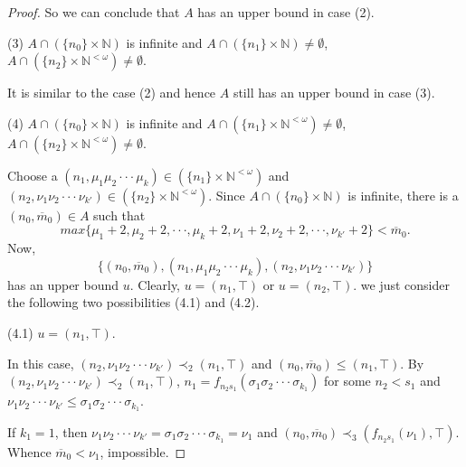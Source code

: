\documentclass[10pt,a4paper]{amsart}
\begin{document}
\begin{proof}
So we can conclude that $A$ has an upper bound in case (2).



(3) $A\cap(\{n_{0}\}\times\mathbb{N})$ is infinite and $A\cap(\{n_{1}\}\times\mathbb{N})\neq\emptyset$, $A\cap(\{n_{2}\}\times\mathbb{N}^{<\omega})\neq\emptyset$.

It is similar to the case (2) and hence $A$ still has an upper bound in case (3).

(4) $A\cap(\{n_{0}\}\times\mathbb{N})$ is infinite and $A\cap(\{n_{1}\}\times\mathbb{N}^{<\omega})\neq\emptyset$, $A\cap(\{n_{2}\}\times\mathbb{N}^{<\omega})\neq\emptyset$.

Choose a $(n_{1},\mu_{1}\mu_{2}\cdot\cdot\cdot\mu_{k})\in(\{n_{1}\}\times\mathbb{N}^{<\omega})$ and $(n_{2},\nu_{1}\nu_{2}\cdot\cdot\cdot\nu_{k'})\in(\{n_{2}\}\times\mathbb{N}^{<\omega})$. Since $A\cap(\{n_{0}\}\times\mathbb{N})$ is infinite, there is a $(n_{0},\overline{m}_{0})\in A$ such that $$max\{\mu_{1}+2,\mu_{2}+2,\cdot\cdot\cdot,\mu_{k}+2,\nu_{1}+2,\nu_{2}+2,\cdot\cdot\cdot,\nu_{k'}+2\}<\overline{m}_{0}.$$
Now, $$\{(n_{0},\overline{m}_{0}),(n_{1},\mu_{1}\mu_{2}\cdot\cdot\cdot\mu_{k}),(n_{2},\nu_{1}\nu_{2}\cdot\cdot\cdot\nu_{k'})\}$$ has an upper bound $u$. Clearly, $u=(n_{1},\top)$ or $u=(n_{2},\top)$. we just consider the following two possibilities (4.1) and (4.2).

(4.1) $u=(n_{1},\top)$.

In this case, $(n_{2},\nu_{1}\nu_{2}\cdot\cdot\cdot\nu_{k'})\prec_{2}(n_{1},\top)$ and $(n_{0},\overline{m}_{0})\leq(n_{1},\top)$. By $(n_{2},\nu_{1}\nu_{2}\cdot\cdot\cdot\nu_{k'})\prec_{2}(n_{1},\top)$, $n_{1}=f_{n_{2}s_{1}}(\sigma_{1}\sigma_{2}\cdot\cdot\cdot\sigma_{k_{1}})$ for some $n_{2}<s_{1}$ and $\nu_{1}\nu_{2}\cdot\cdot\cdot\nu_{k'}\leq\sigma_{1}\sigma_{2}\cdot\cdot\cdot\sigma_{k_{1}}$.

If $k_{1}=1$, then $\nu_{1}\nu_{2}\cdot\cdot\cdot\nu_{k'}=\sigma_{1}\sigma_{2}\cdot\cdot\cdot\sigma_{k_{1}}=\nu_{1}$ and $(n_{0},\overline{m}_{0})\prec_{3}(f_{n_{2}s_{1}}(\nu_{1}),\top)$. Whence $\overline{m}_{0}<\nu_{1}$, impossible.


\end{proof}
\end{document}
